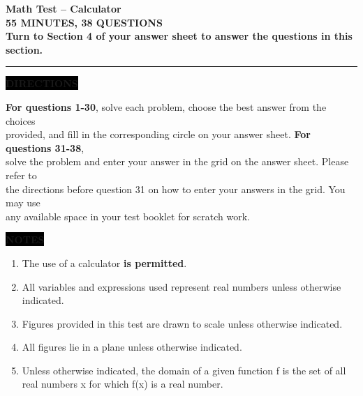 \documentclass[10pt,twoside]{article}
\begin{document}
\pagestyle{fancy}

\enlargethispage{2cm}

\hspace*{32mm}
\parbox{14cm}{%
{\huge \textbf{Math Test -- Calculator}}\\

{\Large \textbf{55 MINUTES, 38 QUESTIONS}} \\[3mm]


\textbf{Turn to Section 4 of your answer sheet to answer the questions in this section.}\\[2mm]
%
}
\hrule height 1pt

\vspace*{5mm}


\hspace*{32mm}
\parbox{14cm}{%
\raggedright
\colorbox{black}{\color{white}\textbf{\small DIRECTIONS}}\hskip-2pt

\vspace*{5mm}

\textbf{For questions 1-30}, solve each problem, choose the best answer from the choices\\
provided, and fill in the corresponding circle on your answer sheet. \textbf{For questions 31-38},\\
solve the problem and enter your answer in the grid on the answer sheet. Please refer to\\
the directions before question 31 on how to enter your answers in the grid. You may use\\
any available space in your test booklet for scratch work.
}

\vspace*{3mm}


\hspace*{32mm}
\parbox{15cm}{%
\raggedright
\colorbox{black}{\color{white}\textbf{\small NOTES}}\hskip-2pt

\vspace*{0mm}

\begin{enumerate}[itemsep=0mm,leftmargin=5mm]
	\item The use of a calculator \textbf{is permitted}.
	\item All variables and expressions used represent real numbers unless otherwise indicated.
	\item Figures provided in this test are drawn to scale unless otherwise indicated.
	\item All figures lie in a plane unless otherwise indicated.
	\item Unless otherwise indicated, the domain of a given function f is the set of all real numbers x for which f(x) is a real number.
\end{enumerate}	
	}
\end{document}
